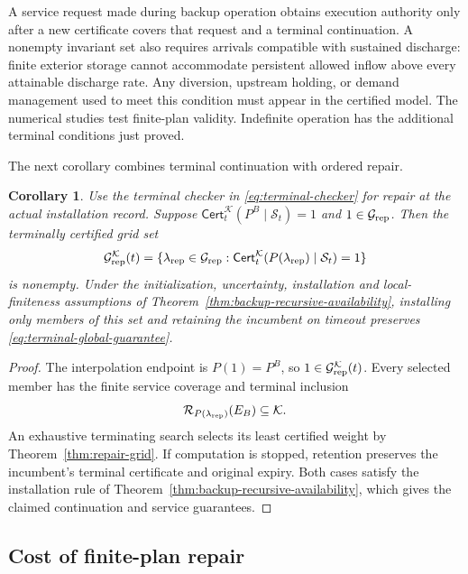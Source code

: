 \documentclass[preprint,12pt]{elsarticle}
\newtheorem{corollary}{Corollary}
\begin{document}
A service request made during backup operation obtains execution authority
only after a new certificate covers that request and a terminal
continuation. A nonempty invariant set also requires arrivals compatible
with sustained discharge: finite exterior storage cannot accommodate
persistent allowed inflow above every attainable discharge rate. Any
diversion, upstream holding, or demand management used to meet this
condition must appear in the certified model. The numerical studies test
finite-plan validity. Indefinite operation has the additional terminal
conditions just proved.

The next corollary combines terminal continuation with ordered repair.

\begin{corollary}
\label{cor:repair-recursive}
Use the terminal checker in \eqref{eq:terminal-checker} for repair
at the actual installation record. Suppose
$\mathsf{Cert}^{\mathcal K}_t(P^B\mid\mathcal S_t)=1$ and
$1\in\mathcal G_{\rm rep}$. Then the terminally certified grid set
\begin{equation}
\mathcal G_{\rm rep}^{\mathcal K}(t)=
\{\lambda_{\rm rep}\in\mathcal G_{\rm rep}:
\mathsf{Cert}^{\mathcal K}_t(P(\lambda_{\rm rep})\mid\mathcal S_t)=1\}
\label{eq:repair-terminal-grid}
\end{equation}
is nonempty. Under the initialization, uncertainty, installation and
local-finiteness assumptions of
Theorem~\ref{thm:backup-recursive-availability}, installing only members
of this set and retaining the incumbent on timeout preserves
\eqref{eq:terminal-global-guarantee}.
\end{corollary}

\begin{proof}
The interpolation endpoint is $P(1)=P^B$, so
$1\in\mathcal G_{\rm rep}^{\mathcal K}(t)$. Every selected member
has the finite service coverage and terminal inclusion
\[
\mathcal R_{P(\lambda_{\rm rep})}(E_B)\subseteq\mathcal K.
\]
An exhaustive terminating search selects its least certified weight by
Theorem~\ref{thm:repair-grid}. If computation is stopped, retention
preserves the incumbent's terminal certificate and original expiry.
Both cases satisfy the installation rule of
Theorem~\ref{thm:backup-recursive-availability}, which gives the claimed
continuation and service guarantees.
\end{proof}

\subsection{Cost of finite-plan repair}
\label{sec:repair-cost-bound}
\end{document}
